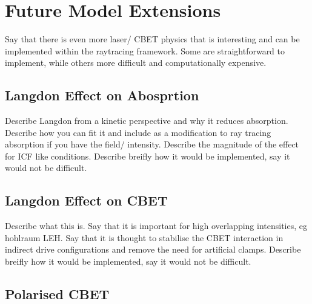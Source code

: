 \section{Future Model Extensions}

Say that there is even more laser/ CBET physics that is interesting and can be implemented within the raytracing framework.
Some are straightforward to implement, while others more difficult and computationally expensive.

\subsection{Langdon Effect on Abosprtion}

Describe Langdon from a kinetic perspective and why it reduces absorption.
Describe how you can fit it and include as a modification to ray tracing absorption if you have the field/ intensity.
Describe the magnitude of the effect for ICF like conditions.
Describe breifly how it would be implemented, say it would not be difficult.

\subsection{Langdon Effect on CBET}

Describe what this is.
Say that it is important for high overlapping intensities, eg hohlraum LEH.
Say that it is thought to stabilise the CBET interaction in indirect drive configurations and remove the need for artificial clamps.
Describe breifly how it would be implemented, say it would not be difficult.

\subsection{Polarised CBET}

